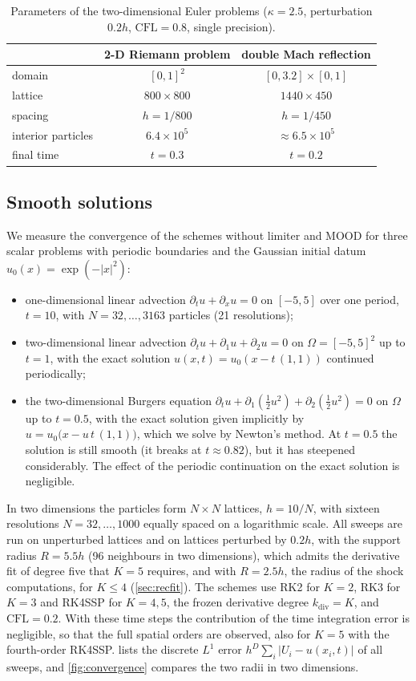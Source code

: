 \documentclass[smallextended]{svjour3}
\numberwithin{equation}{section}
\newcommand{\CFL}{\mathrm{CFL}}
\begin{document}
\begin{table}[!htbp]
\centering
\caption{Parameters of the two-dimensional Euler problems ($\kappa=2.5$, perturbation $0.2h$, $\CFL=0.8$, single precision).}\label{tab:setup}
\footnotesize\setlength{\tabcolsep}{3pt}
\begin{tabular}{lcc}
\toprule
& 2-D Riemann problem & double Mach reflection\\
\midrule
domain & $[0,1]^2$ & $[0,3.2]\times[0,1]$\\
lattice & $800\times800$ & $1440\times450$\\
spacing & $h=1/800$ & $h=1/450$\\
interior particles & $6.4\times10^5$ & $\approx6.5\times10^5$\\
final time & $t=0.3$ & $t=0.2$\\
\bottomrule
\end{tabular}
\end{table}

\subsection{Smooth solutions}\label{sec:smooth}

We measure the convergence of the schemes without limiter and MOOD for three scalar problems with periodic boundaries and the Gaussian initial datum $u_0(x)=\exp(-|x|^2)$:
\begin{itemize}
\item one-dimensional linear advection $\partial_tu+\partial_xu=0$ on $[-5,5]$ over one period, $t=10$, with $N=32,\dots,3163$ particles (21 resolutions);
\item two-dimensional linear advection $\partial_tu+\partial_1u+\partial_2u=0$ on $\Omega=[-5,5]^2$ up to $t=1$, with the exact solution $u(x,t)=u_0(x-t\,(1,1))$ continued periodically;
\item the two-dimensional Burgers equation $\partial_tu+\partial_1(\tfrac12u^2)+\partial_2(\tfrac12u^2)=0$ on $\Omega$ up to $t=0.5$, with the exact solution given implicitly by $u=u_0\big(x-u\,t\,(1,1)\big)$, which we solve by Newton's method. At $t=0.5$ the solution is still smooth (it breaks at $t\approx0.82$), but it has steepened considerably. The effect of the periodic continuation on the exact solution is negligible.
\end{itemize}
In two dimensions the particles form $N\times N$ lattices, $h=10/N$, with sixteen resolutions $N=32,\dots,1000$ equally spaced on a logarithmic scale. All sweeps are run on unperturbed lattices and on lattices perturbed by $0.2h$, with the support radius $R=5.5h$ (96 neighbours in two dimensions), which admits the derivative fit of degree five that $K=5$ requires, and with $R=2.5h$, the radius of the shock computations, for $K\le4$ (\cref{sec:recfit}). The schemes use RK2 for $K=2$, RK3 for $K=3$ and RK4SSP for $K=4,5$, the frozen derivative degree $k_{\mathrm{div}}=K$, and $\CFL=0.2$. With these time steps the contribution of the time integration error is negligible, so that the full spatial orders are observed, also for $K=5$ with the fourth-order RK4SSP.  lists the discrete $L^1$ error $h^D\sum_i|U_i-u(x_i,t)|$ of all sweeps, and \cref{fig:convergence} compares the two radii in two dimensions.
\end{document}
